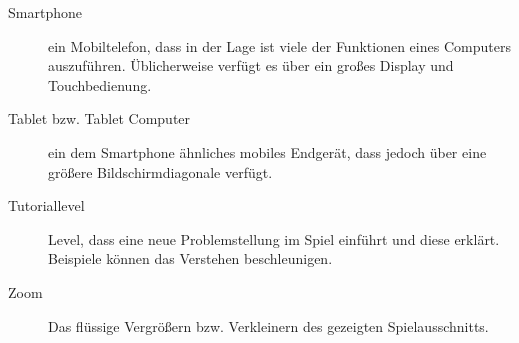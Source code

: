 \begin{description}
	\item[Smartphone] ein Mobiltelefon, dass in der Lage ist viele der Funktionen eines Computers auszuführen. Üblicherweise verfügt es über ein großes Display und Touchbedienung.
	\item[Tablet bzw. Tablet Computer] ein dem Smartphone ähnliches mobiles Endgerät, dass jedoch über eine größere Bildschirmdiagonale verfügt.
	\item[Tutoriallevel] Level, dass eine neue Problemstellung im Spiel einführt und diese erklärt. Beispiele können das Verstehen beschleunigen.
	\item[Zoom] Das flüssige Vergrößern bzw. Verkleinern des gezeigten Spielausschnitts.
	
	
	
\end{description}
